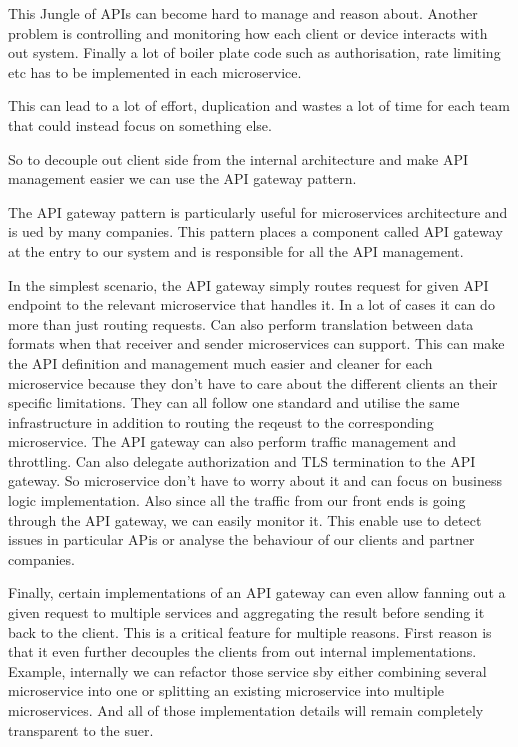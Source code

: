 This Jungle of APIs can become hard to manage and reason about.
Another problem is controlling and monitoring how each client or device interacts with out system.
Finally a lot of boiler plate code such as authorisation, rate limiting etc has to be implemented in each microservice.

This can lead to a lot of effort, duplication and wastes a lot of time for each team that could instead focus on something else.

So to decouple out client side from the internal architecture and make API management easier we can use the API gateway pattern.

The API gateway pattern is particularly useful for microservices architecture and is ued by many companies.
This pattern places a component called API gateway at the entry to our system and is responsible for all the API management.

In the simplest scenario, the API gateway simply routes request for given API endpoint to the relevant microservice that handles it.
In a lot of cases it can do more than just routing requests.
Can also perform translation between data formats when that receiver and sender microservices can support.
This can make the API definition and management much easier and cleaner for each microservice because they don't have to care about the different clients an their specific limitations.
They can all follow one standard and utilise the same infrastructure in addition to routing the reqeust to the corresponding microservice.
The API gateway can also perform traffic management and throttling.
Can also delegate authorization and TLS termination to the API gateway.
So microservice don't have to worry about it and can focus on business logic implementation.
Also since all the traffic from our front ends is going through the API gateway, we can easily monitor it.
This enable use to detect issues in particular APis or analyse the behaviour of our clients and partner companies.

Finally, certain implementations of an API gateway can even allow fanning out a given request to multiple services and aggregating the result before sending it back to the client.
This is a critical feature for multiple reasons.
First reason is that it even further decouples the clients from out internal implementations.
Example, internally we can refactor those service sby either combining several microservice into one or splitting an existing microservice into multiple microservices.
And all of those implementation details will remain completely transparent to the suer.

